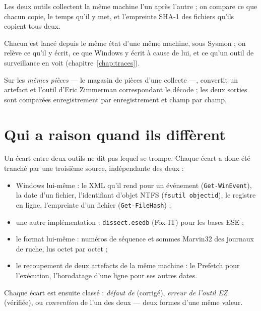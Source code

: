 \documentclass[11pt,a4paper,oneside]{report}
\begin{document}
\begin{description}[style=nextline,leftmargin=1em]
  \item[Collecte : \wac{} face à KAPE] Les deux outils collectent la même
        machine l'un après l'autre ; on compare ce que chacun copie, le temps
        qu'il y met, et l'empreinte SHA-1 des fichiers qu'ils copient tous deux.
  \item[Traces laissées : \wac{}, KAPE et les outils EZ] Chacun est lancé depuis
        le même état d'une même machine, sous Sysmon ; on relève ce qu'il y
        écrit, ce que Windows y écrit à cause de lui, et ce qu'un outil de
        surveillance en voit (chapitre~\ref{chap:traces}).
  \item[Décodage : \wac{} face aux outils EZ] Sur les \emph{mêmes pièces} --- le
        magasin de pièces d'une collecte \wac{} ---, \wac{} convertit un artefact
        et l'outil d'Eric Zimmerman correspondant le décode ; les deux sorties
        sont comparées enregistrement par enregistrement et champ par champ.
\end{description}

\section{Qui a raison quand ils diffèrent}

Un écart entre deux outils ne dit pas lequel se trompe. Chaque écart a donc été
tranché par une troisième source, indépendante des deux :

\begin{itemize}[nosep]
  \item Windows lui-même : le XML qu'il rend pour un événement
        (\texttt{Get-WinEvent}), la date d'un fichier, l'identifiant d'objet
        NTFS (\texttt{fsutil objectid}), le registre en ligne, l'empreinte d'un
        fichier (\texttt{Get-FileHash}) ;
  \item une autre implémentation : \texttt{dissect.esedb} (Fox-IT) pour les bases
        ESE ;
  \item le format lui-même : numéros de séquence et sommes Marvin32 des journaux
        de ruche, lus octet par octet ;
  \item le recoupement de deux artefacts de la même machine : le Prefetch pour
        l'exécution, l'horodatage d'une ligne pour ses autres dates.
\end{itemize}

Chaque écart est ensuite classé : \emph{défaut de \wac{}} (corrigé), \emph{erreur
de l'outil EZ} (vérifiée), ou \emph{convention} de l'un des deux --- deux formes
d'une même valeur.
\end{document}
